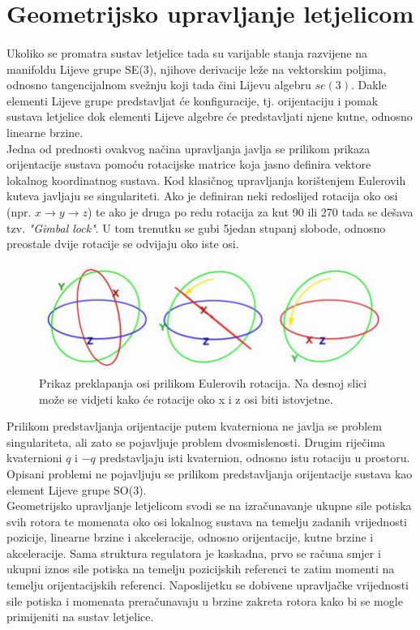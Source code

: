 \documentclass[times, utf8, diplomski]{fer}
\begin{document}
	\newpage
	\clearpage
	
\section{Geometrijsko upravljanje letjelicom}
	
	\paragraph{}Ukoliko se promatra sustav letjelice tada su varijable stanja razvijene na manifoldu Lijeve grupe SE(3), njihove derivacije leže na vektorskim poljima, odnosno tangencijalnom svežnju koji tada čini Lijevu algebru $se(3)$. Dakle elementi Lijeve grupe predstavljat će konfiguracije, tj. orijentaciju i pomak sustava letjelice dok elementi Lijeve algebre će predstavljati njene kutne, odnosno linearne brzine. \\
	Jedna od prednosti ovakvog načina upravljanja javlja se prilikom prikaza orijentacije sustava pomoću rotacijske matrice koja jasno definira vektore lokalnog koordinatnog sustava. Kod klasičnog upravljanja korištenjem Eulerovih kuteva javljaju se singulariteti. Ako je definiran neki redoslijed rotacija oko osi (npr. $x \rightarrow y \rightarrow z$) te ako je druga po redu rotacija za kut 90 ili 270 tada se dešava tzv. \textit{"Gimbal lock"}. U tom trenutku se gubi 5jedan stupanj slobode, odnosno preostale dvije rotacije se odvijaju oko iste osi.
	
	\begin{figure}[h!]
		\includegraphics[width=\textwidth]{figures/gimbal_lock.png}
		\caption{Prikaz preklapanja osi prilikom Eulerovih rotacija. Na desnoj slici može se vidjeti kako će rotacije oko x i z osi biti istovjetne.}
	\end{figure}
	
	\noindent Prilikom predstavljanja orijentacije putem kvaterniona ne javlja se problem singulariteta, ali zato se pojavljuje problem dvosmislenosti. Drugim riječima kvaternioni $q$ i $-q$ predstavljaju isti kvaternion, odnosno istu rotaciju u prostoru. Opisani problemi ne pojavljuju se prilikom predstavljanja orijentacije sustava kao element Lijeve grupe SO(3). \\
	Geometrijsko upravljanje letjelicom svodi se na izračunavanje ukupne sile potiska svih rotora te momenata oko osi lokalnog sustava na temelju zadanih vrijednosti pozicije, linearne brzine i akceleracije, odnosno orijentacije, kutne brzine i akceleracije. Sama struktura regulatora je kaskadna, prvo se računa smjer i ukupni iznos sile potiska na temelju pozicijskih referenci te zatim momenti na temelju orijentacijskih referenci. Naposlijetku se dobivene upravljačke vrijednosti sile potiska i momenata preračunavaju u brzine zakreta rotora kako bi se mogle primijeniti na sustav letjelice.
\end{document}
